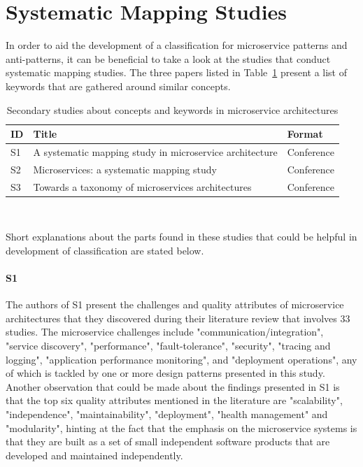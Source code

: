 \documentclass{Configuration_Files/PoliMi3i_thesis}
\begin{document}
\section{Systematic Mapping Studies}
\label{sec:sys_map}

In order to aid the development of a classification for microservice patterns and anti-patterns, it can be beneficial to take a look at the studies that conduct systematic mapping studies.
The three papers listed in Table~\ref{table:secondary_studies} present a list of keywords that are gathered around similar concepts.

\begin{table}[H]
\centering 
    \begin{tabular}{|l p{30em} l|}
    \hline
    \rowcolor{bluepoli!40}
    \textbf{ID} & \textbf{Title} & \textbf{Format}\T\B \\
    \hline \hline
    S1 & A systematic mapping study in microservice architecture \cite{7796008} & Conference\T\B\\
    \hline
    \rowcolor{bluepoli!10}
    S2 & Microservices: a systematic mapping study \cite{10.5220/0005785501370146} & Conference\T\B\\
    \hline
    S3 & Towards a taxonomy of microservices architectures \cite{10.1007/978-3-319-74781-1_15} & Conference\T\B\\
    \hline
    \end{tabular}
    \\[10pt]
    \caption{Secondary studies about concepts and keywords in microservice architectures}
    \label{table:secondary_studies}
\end{table}

Short explanations about the parts found in these studies that could be helpful in development of classification are stated below.

\paragraph{S1} The authors of S1 present the challenges and quality attributes of microservice architectures that they discovered during their literature review that involves 33 studies.
The microservice challenges include "communication/integration", "service discovery", "performance", "fault-tolerance", "security", "tracing and logging", "application performance monitoring", and "deployment operations", any of which is tackled by one or more design patterns presented in this study.
Another observation that could be made about the findings presented in S1 is that the top six quality attributes mentioned in the literature are "scalability", "independence", "maintainability", "deployment", "health management" and "modularity", hinting at the fact that the emphasis on the microservice systems is that they are built as a set of small independent software products that are developed and maintained independently.
\end{document}

